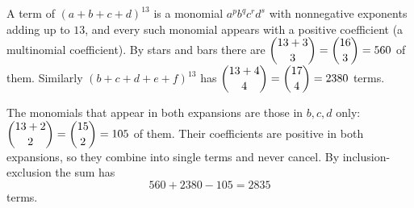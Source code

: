 A term of $(a+b+c+d)^{13}$ is a monomial $a^pb^qc^rd^s$ with nonnegative exponents adding up to $13$, and every such monomial appears with a positive coefficient (a multinomial coefficient). By stars and bars there are $\dbinom{13+3}{3}=\dbinom{16}{3}=560$ of them. Similarly $(b+c+d+e+f)^{13}$ has $\dbinom{13+4}{4}=\dbinom{17}{4}=2380$ terms.

The monomials that appear in both expansions are those in $b,c,d$ only: $\dbinom{13+2}{2}=\dbinom{15}{2}=105$ of them. Their coefficients are positive in both expansions, so they combine into single terms and never cancel. By inclusion-exclusion the sum has
\[560+2380-105=\boxed{2835}\]
terms.
